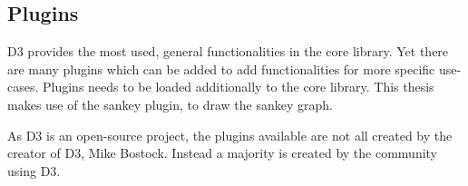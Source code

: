 \subsection{Plugins}

D3 provides the most used, general functionalities in the core library. Yet there are many plugins which can be added to add functionalities for more specific use-cases. Plugins needs to be loaded additionally to the core library. This thesis makes use of the sankey plugin\cite{sankey_package}, to draw the sankey graph.

As D3 is an open-source project, the plugins available are not all created by the creator of D3, Mike Bostock. Instead a majority is created by the community using D3.
